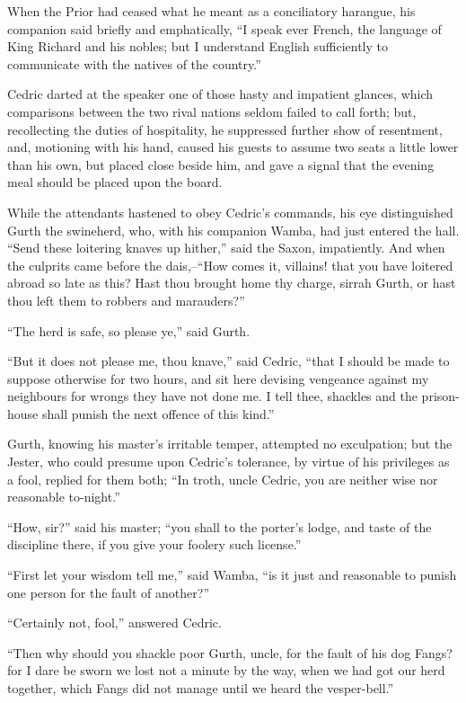 When the Prior had ceased what he meant as a conciliatory harangue, his
companion said briefly and emphatically, ``I speak ever French, the
language of King Richard and his nobles; but I understand English
sufficiently to communicate with the natives of the country.''

Cedric darted at the speaker one of those hasty and impatient glances,
which comparisons between the two rival nations seldom failed to call
forth; but, recollecting the duties of hospitality, he suppressed
further show of resentment, and, motioning with his hand, caused his
guests to assume two seats a little lower than his own, but placed close
beside him, and gave a signal that the evening meal should be placed
upon the board.

While the attendants hastened to obey Cedric's commands, his eye
distinguished Gurth the swineherd, who, with his companion Wamba, had
just entered the hall. ``Send these loitering knaves up hither,'' said
the Saxon, impatiently. And when the culprits came before the
dais,--``How comes it, villains! that you have loitered abroad so late
as this? Hast thou brought home thy charge, sirrah Gurth, or hast thou
left them to robbers and marauders?''

``The herd is safe, so please ye,'' said Gurth.

``But it does not please me, thou knave,'' said Cedric, ``that I should
be made to suppose otherwise for two hours, and sit here devising
vengeance against my neighbours for wrongs they have not done me. I tell
thee, shackles and the prison-house shall punish the next offence of
this kind.''

Gurth, knowing his master's irritable temper, attempted no exculpation;
but the Jester, who could presume upon Cedric's tolerance, by virtue of
his privileges as a fool, replied for them both; ``In troth, uncle
Cedric, you are neither wise nor reasonable to-night.''

``How, sir?'' said his master; ``you shall to the porter's lodge, and
taste of the discipline there, if you give your foolery such license.''

``First let your wisdom tell me,'' said Wamba, ``is it just and
reasonable to punish one person for the fault of another?''

``Certainly not, fool,'' answered Cedric.

``Then why should you shackle poor Gurth, uncle, for the fault of his
dog Fangs? for I dare be sworn we lost not a minute by the way, when we
had got our herd together, which Fangs did not manage until we heard the
vesper-bell.''

